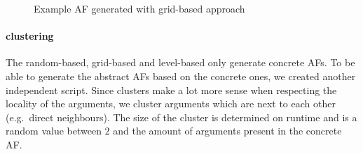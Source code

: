 \begin{figure}[h]
\begin{subfigure}[t]{0.45\textwidth}
    \label{af:ImplementationLevelBasedExampleAFsb}
\end{subfigure}%
\caption{Example AF generated with grid-based approach}
\label{fig:ImplementationLevelBasedExampleAFs}
\end{figure}

\paragraph{clustering} The random-based, grid-based and level-based only generate concrete AFs. To be able to generate the abstract AFs based on the concrete ones, we created another independent script. Since clusters make a lot more sense when respecting the locality of the arguments, we cluster arguments which are next to each other (e.g.\ direct neighbours). The size of the cluster is determined on runtime and is a random value between $2$ and the amount of arguments present in the concrete AF.


\newpage
